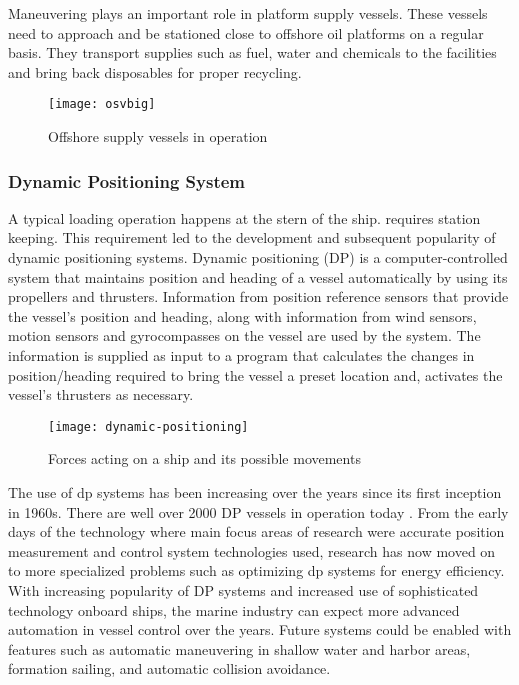Maneuvering plays an important role in platform supply vessels. These vessels need to approach and be stationed close to offshore oil platforms on a regular basis. They transport supplies such as fuel, water and chemicals to the facilities and bring back disposables for proper recycling. 
 
\begin{figure}[h]
	\centering
	\texttt{[image: osvbig]}
	\caption{Offshore supply vessels in operation}
	\label{fig:osvbig}
\end{figure}

\subsubsection{Dynamic Positioning System}

A typical loading operation happens at the stern of the ship. requires station keeping.
This requirement led to the development and subsequent popularity of dynamic positioning systems. Dynamic positioning (DP) is a computer-controlled system that maintains position and heading of a vessel automatically by using its propellers and thrusters. Information from position reference sensors that provide the vessel’s position and heading, along with information from wind sensors, motion sensors and gyrocompasses on the vessel are used by the system. The information is supplied as input to a program that calculates the changes in position/heading required to bring the vessel a preset location and, activates the vessel’s thrusters as necessary.

\begin{figure}
	\centering
	\texttt{[image: dynamic-positioning]}
	\caption{Forces acting on a ship and its possible movements}
	\label{fig:shipforces}
\end{figure}

The use of dp systems has been increasing over the years since its first inception in 1960s. There are well over 2000 DP vessels in operation today \cite{sorensen2011survey}. From the early days of the technology where main focus areas of research were accurate position measurement and control system technologies used, research has now moved on to more specialized problems such as optimizing dp systems for energy efficiency. With increasing popularity of DP systems and increased use of sophisticated technology onboard ships, the marine industry can expect more advanced automation in vessel control over the years. Future systems could be enabled with features such as automatic maneuvering in shallow water and harbor areas, formation sailing, and automatic collision avoidance.

